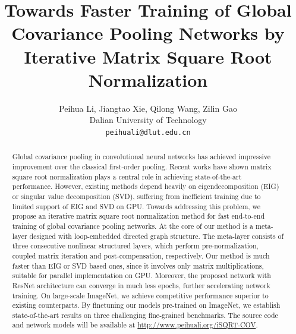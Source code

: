 \documentclass[10pt,twocolumn,letterpaper]{article}
\begin{document}
\title{Towards Faster Training of Global Covariance Pooling Networks by Iterative Matrix Square Root Normalization} 
\author{Peihua Li, Jiangtao Xie, Qilong Wang, Zilin Gao\\
	Dalian University of Technology\\
	{\tt\small peihuali@dlut.edu.cn}
}

\maketitle
\thispagestyle{empty}

\begin{abstract}
Global covariance pooling in convolutional neural networks  has achieved impressive improvement over the classical first-order pooling. Recent works have shown matrix square root normalization plays a central role in achieving state-of-the-art performance. However, existing methods depend heavily  on eigendecomposition (EIG)  or singular value decomposition (SVD), suffering from inefficient training due to limited support of EIG and SVD on  GPU. Towards addressing this problem, we propose an iterative matrix square root normalization method for fast end-to-end  training of global covariance pooling networks. At the core of our method is  a meta-layer  designed with loop-embedded directed graph structure. The meta-layer  consists of three consecutive nonlinear structured layers, which perform pre-normalization, coupled matrix  iteration and post-compensation, respectively. Our method is much faster than EIG or SVD based ones, since it involves only matrix multiplications, suitable for parallel implementation on GPU.  Moreover, the proposed network with ResNet architecture can converge in much less epochs, further accelerating network training. On large-scale ImageNet, we achieve competitive performance superior to existing counterparts. By  finetuning our models pre-trained on ImageNet, we establish  state-of-the-art results on three challenging fine-grained benchmarks. The  source code and network models will be available at  \href{http://www.peihuali.org/iSQRT-COV}{http://www.peihuali.org/iSQRT-COV}. 
\end{abstract}
\end{document}
